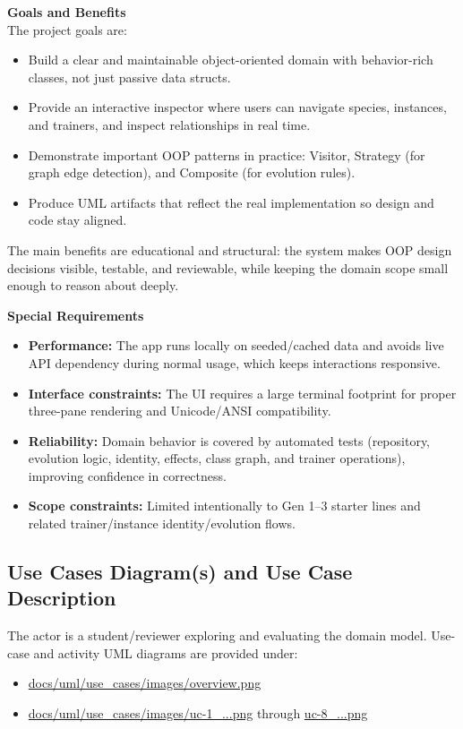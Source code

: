 \documentclass[12pt]{article}
\begin{document}
\textbf{Goals and Benefits}\\
The project goals are:
\begin{itemize}
    \item Build a clear and maintainable object-oriented domain with
    behavior-rich classes, not just passive data structs.
    \item Provide an interactive inspector where users can navigate species,
    instances, and trainers, and inspect relationships in real time.
    \item Demonstrate important OOP patterns in practice: Visitor, Strategy
    (for graph edge detection), and Composite (for evolution rules).
    \item Produce UML artifacts that reflect the real implementation so design
    and code stay aligned.
\end{itemize}

The main benefits are educational and structural: the system makes OOP design
decisions visible, testable, and reviewable, while keeping the domain scope
small enough to reason about deeply.

\textbf{Special Requirements}\\
\begin{itemize}
    \item \textbf{Performance:} The app runs locally on seeded/cached data and
    avoids live API dependency during normal usage, which keeps interactions
    responsive.
    \item \textbf{Interface constraints:} The UI requires a large terminal
    footprint for proper three-pane rendering and Unicode/ANSI compatibility.
    \item \textbf{Reliability:} Domain behavior is covered by automated tests
    (repository, evolution logic, identity, effects, class graph, and trainer
    operations), improving confidence in correctness.
    \item \textbf{Scope constraints:} Limited intentionally to Gen 1--3
    starter lines and related trainer/instance identity/evolution flows.
\end{itemize}

\subsection*{Use Cases Diagram(s) and Use Case Description}
The actor is a student/reviewer exploring and evaluating the domain model.
Use-case and activity UML diagrams are provided under:
\begin{itemize}
    \item \url{docs/uml/use_cases/images/overview.png}
    \item \url{docs/uml/use_cases/images/uc-1_...png} through
    \url{uc-8_...png}
\end{itemize}
\end{document}
